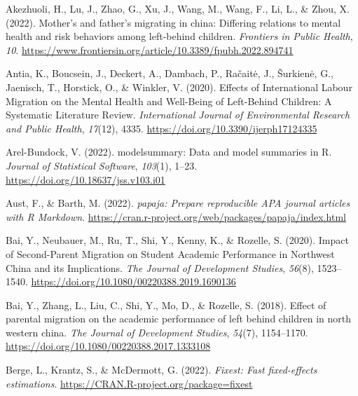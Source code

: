 \documentclass[
  man,floatsintext]{apa7}
\newlength{\cslhangindent}
\newlength{\cslentryspacingunit} %
\newenvironment{CSLReferences}[2] %
 {%
  \setlength{\parindent}{0pt}
  \ifodd #1
  \let\oldpar\par
  \def\par{\hangindent=\cslhangindent\oldpar}
  \fi
  \setlength{\parskip}{#2\cslentryspacingunit}
 }%
 {}
\begin{document}
\hypertarget{refs}{}
\begin{CSLReferences}{1}{0}
\leavevmode{}%
Akezhuoli, H., Lu, J., Zhao, G., Xu, J., Wang, M., Wang, F., Li, L., \& Zhou, X. (2022). Mother's and father's migrating in china: Differing relations to mental health and risk behaviors among left-behind children. \emph{Frontiers in Public Health}, \emph{10}. \url{https://www.frontiersin.org/article/10.3389/fpubh.2022.894741}

\leavevmode{}%
Antia, K., Boucsein, J., Deckert, A., Dambach, P., Račaitė, J., Šurkienė, G., Jaenisch, T., Horstick, O., \& Winkler, V. (2020). Effects of International Labour Migration on the Mental Health and Well-Being of Left-Behind Children: A Systematic Literature Review. \emph{International Journal of Environmental Research and Public Health}, \emph{17}(12), 4335. \url{https://doi.org/10.3390/ijerph17124335}

\leavevmode{}%
Arel-Bundock, V. (2022). {modelsummary}: Data and model summaries in {R}. \emph{Journal of Statistical Software}, \emph{103}(1), 1--23. \url{https://doi.org/10.18637/jss.v103.i01}

\leavevmode{}%
Aust, F., \& Barth, M. (2022). \emph{{papaja}: {Prepare} reproducible {APA} journal articles with {R Markdown}}. \url{https://cran.r-project.org/web/packages/papaja/index.html}

\leavevmode{}%
Bai, Y., Neubauer, M., Ru, T., Shi, Y., Kenny, K., \& Rozelle, S. (2020). Impact of Second-Parent Migration on Student Academic Performance in Northwest China and its Implications. \emph{The Journal of Development Studies}, \emph{56}(8), 1523--1540. \url{https://doi.org/10.1080/00220388.2019.1690136}

\leavevmode{}%
Bai, Y., Zhang, L., Liu, C., Shi, Y., Mo, D., \& Rozelle, S. (2018). Effect of parental migration on the academic performance of left behind children in north western china. \emph{The Journal of Development Studies}, \emph{54}(7), 1154--1170. \url{https://doi.org/10.1080/00220388.2017.1333108}

\leavevmode{}%
Berge, L., Krantz, S., \& McDermott, G. (2022). \emph{Fixest: Fast fixed-effects estimations}. \url{https://CRAN.R-project.org/package=fixest}


\end{CSLReferences}
\end{document}
